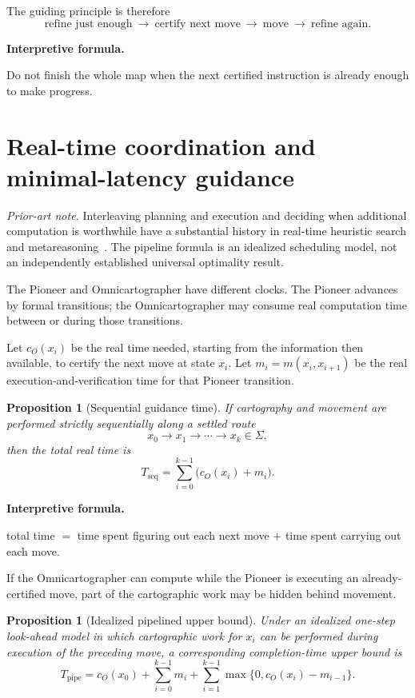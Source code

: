 \documentclass[11pt]{article}
\newtheorem{proposition}[theorem]{Proposition}
\theoremstyle{definition}
\theoremstyle{remark}
\newcommand{\Sett}{\Sigma}
\newenvironment{interpretiveformula}{%
  \begin{center}\begin{minipage}{0.92\linewidth}\small
  \textbf{Interpretive formula.}\ \raggedright}{\end{minipage}\end{center}}
\begin{document}
The guiding principle is therefore
\[
\boxed{\text{refine just enough}\ \longrightarrow\ \text{certify next move}\ \longrightarrow\ \text{move}\ \longrightarrow\ \text{refine again}.}
\]

\begin{interpretiveformula}
Do not finish the whole map when the next certified instruction is already enough to make progress.
\end{interpretiveformula}

\section{Real-time coordination and minimal-latency guidance}
\noindent\textit{Prior-art note.} Interleaving planning and execution and deciding when additional computation is worthwhile have a substantial history in real-time heuristic search and metareasoning~\cite{korf,russell}. The pipeline formula is an idealized scheduling model, not an independently established universal optimality result.

The Pioneer and Omnicartographer have different clocks. The Pioneer advances by formal transitions; the Omnicartographer may consume real computation time between or during those transitions.

Let $c_O(x_i)$ be the real time needed, starting from the information then available, to certify the next move at state $x_i$. Let $m_i=m(x_i,x_{i+1})$ be the real execution-and-verification time for that Pioneer transition.

\begin{proposition}[Sequential guidance time]
If cartography and movement are performed strictly sequentially along a settled route
\[
x_0\to x_1\to\cdots\to x_k\in\Sett,
\]
then the total real time is
\[
\boxed{
T_{\mathrm{seq}}=\sum_{i=0}^{k-1}\bigl(c_O(x_i)+m_i\bigr).
}
\]
\end{proposition}

\begin{interpretiveformula}
total time $=$ time spent figuring out each next move $+$ time spent carrying out each move.
\end{interpretiveformula}

If the Omnicartographer can compute while the Pioneer is executing an already-certified move, part of the cartographic work may be hidden behind movement.

\begin{proposition}[Idealized pipelined upper bound]
Under an idealized one-step look-ahead model in which cartographic work for $x_i$ can be performed during execution of the preceding move, a corresponding completion-time upper bound is
\[
\boxed{
T_{\mathrm{pipe}}
=
 c_O(x_0)
+\sum_{i=0}^{k-1}m_i
+\sum_{i=1}^{k-1}\max\{0,c_O(x_i)-m_{i-1}\}.
}
\]
\end{proposition}
\end{document}
